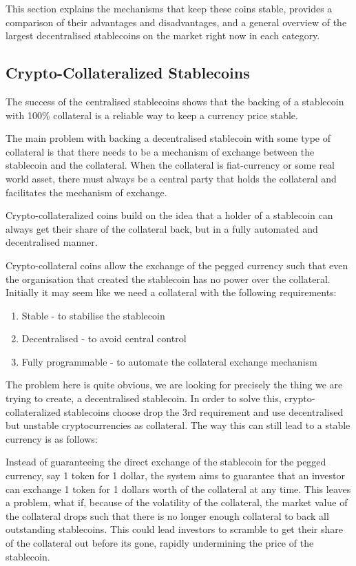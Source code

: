 \documentclass[english,]{IEEEtran}
\providecommand{\tightlist}{%
  \setlength{\itemsep}{0pt}\setlength{\parskip}{0pt}}
\begin{document}
This section explains the mechanisms that keep these coins stable,
provides a comparison of their advantages and disadvantages, and a
general overview of the largest decentralised stablecoins on the market
right now in each category.

\subsection{Crypto-Collateralized
Stablecoins}\label{crypto-collateralized-stablecoins}

The success of the centralised stablecoins shows that the backing of a
stablecoin with 100\% collateral is a reliable way to keep a currency
price stable.

The main problem with backing a decentralised stablecoin with some type
of collateral is that there needs to be a mechanism of exchange between
the stablecoin and the collateral. When the collateral is fiat-currency
or some real world asset, there must always be a central party that
holds the collateral and facilitates the mechanism of exchange.

Crypto-collateralized coins build on the idea that a holder of a
stablecoin can always get their share of the collateral back, but in a
fully automated and decentralised manner.

Crypto-collateral coins allow the exchange of the pegged currency such
that even the organisation that created the stablecoin has no power over
the collateral. Initially it may seem like we need a collateral with the
following requirements:

\begin{enumerate}
\def\labelenumi{\arabic{enumi}.}
\tightlist
\item
  Stable - to stabilise the stablecoin
\item
  Decentralised - to avoid central control
\item
  Fully programmable - to automate the collateral exchange mechanism
\end{enumerate}

The problem here is quite obvious, we are looking for precisely the
thing we are trying to create, a decentralised stablecoin. In order to
solve this, crypto-collateralized stablecoins choose drop the 3rd
requirement and use decentralised but unstable cryptocurrencies as
collateral. The way this can still lead to a stable currency is as
follows:

Instead of guaranteeing the direct exchange of the stablecoin for the
pegged currency, say 1 token for 1 dollar, the system aims to guarantee
that an investor can exchange 1 token for 1 dollars worth of the
collateral at any time. This leaves a problem, what if, because of the
volatility of the collateral, the market value of the collateral drops
such that there is no longer enough collateral to back all outstanding
stablecoins. This could lead investors to scramble to get their share of
the collateral out before its gone, rapidly undermining the price of the
stablecoin.
\end{document}
